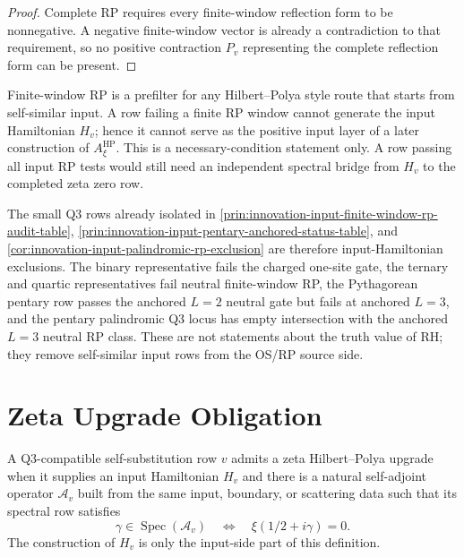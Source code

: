 \begin{proof}
Complete RP requires every finite-window reflection form to be
nonnegative. A negative finite-window vector is already a contradiction to
that requirement, so no positive contraction $P_v$ representing the
complete reflection form can be present.
\end{proof}

\begin{principle}
\label{prin:innovation-input-hilbert-polya-prefilter}
Finite-window RP is a prefilter for any Hilbert--Polya style route that
starts from self-similar input. A row failing a finite RP window cannot
generate the input Hamiltonian $H_v$; hence it cannot serve as the
positive input layer of a later construction of
$A_{\xi}^{\mathrm{HP}}$. This is a necessary-condition statement only. A
row passing all input RP tests would still need an independent spectral
bridge from $H_v$ to the completed zeta zero row.
\end{principle}

\begin{principle}
\label{prin:innovation-input-known-small-qthree-obstructions}
The small Q3 rows already isolated in
\autoref{prin:innovation-input-finite-window-rp-audit-table},
\autoref{prin:innovation-input-pentary-anchored-status-table}, and
\autoref{cor:innovation-input-palindromic-rp-exclusion} are therefore
input-Hamiltonian exclusions. The binary representative fails the charged
one-site gate, the ternary and quartic representatives fail neutral
finite-window RP, the Pythagorean pentary row passes the anchored $L=2$
neutral gate but fails at anchored $L=3$, and the pentary palindromic Q3
locus has empty intersection with the anchored $L=3$ neutral RP class.
These are not statements about the truth value of RH; they remove
self-similar input rows from the OS/RP source side.
\end{principle}

\section{Zeta Upgrade Obligation}
\label{sec:innovation-input-zeta-upgrade-obligation}

\begin{definition}
\label{def:innovation-input-zeta-hilbert-polya-upgrade}
A Q3-compatible self-substitution row $v$ admits a zeta Hilbert--Polya
upgrade when it supplies an input Hamiltonian $H_v$ and there is a
natural self-adjoint operator $\mathcal A_v$ built from the same input,
boundary, or scattering data such that its spectral row satisfies
$$
\gamma\in\operatorname{Spec}(\mathcal A_v)
\quad\Longleftrightarrow\quad
\xi(1/2+i\gamma)=0.
$$
The construction of $H_v$ is only the input-side part of this definition.
\end{definition}

